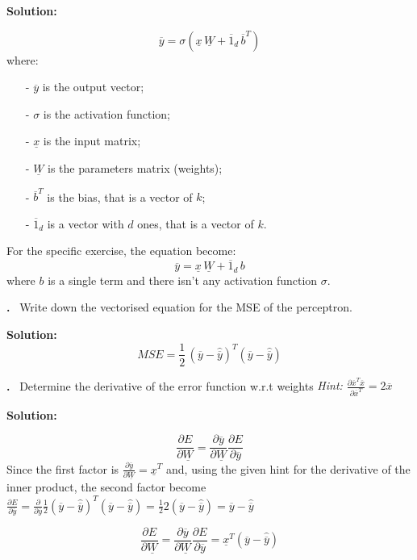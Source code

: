\documentclass[12pt]{article}
\newcounter{problem}
\newcounter{solution}
\newcommand\Problem{%
	\stepcounter{problem}%
	\textbf{\theproblem.}~%
	\setcounter{solution}{0}%
}
\newcommand\Solution{%
	\textbf{Solution:}\\%
}
\begin{document}
\Solution{
	\begin{equation}
	\overline{y}=\sigma(\underline{x} \, \underline{W}+\overline{1}_d \, \overline{b}^T)
	\end{equation}
	where:
	\begin{itemize}
		\item[-] $\overline{y}$ is the output vector; 
		\item[-] $\sigma$ is the activation function;
		\item[-] $\underline{x}$ is the input matrix;
		\item[-] $\underline{W}$ is the parameters matrix (weights);
		\item[-] $\overline{b}^T$ is the bias, that is a vector of $k$;
		\item[-] $\overline{1}_d$ is a vector  with $d$ ones, that is a vector of $k$.
	\end{itemize}
For the specific exercise, the equation become:
	\begin{equation}
	\overline{y}=\underline{x} \, \underline{W}+\overline{1}_d \, b
	\end{equation}
	where $b$ is a single term and there isn't any activation function $\sigma$.
}

\Problem{Write down the vectorised equation for the MSE of the perceptron.}

\Solution{	
	\begin{equation}
	MSE = \frac{1}{2} \, (\overline{y}-\hat{\overline{y}})^T(\overline{y}-\hat{\overline{y}})
	\end{equation}}

\Problem{Determine the derivative of the error function w.r.t weights \textit{Hint: $\frac{\partial \overline{x}^T\overline{x}}{\partial\overline{x}^T} = 2\overline{x}$}}

\Solution{	
	\begin{equation}
	 \frac{\partial E}{\partial \underline{W}}= \frac{\partial \overline{y}}{\partial \underline{W}}\frac{\partial E}{\partial \overline{y}}
	\end{equation}
	Since the first factor is $\frac{\partial \overline{y}}{\partial \underline{W}}=\underline{x}^T$ and, using the given hint for the derivative of the inner product, the second factor become $\frac{\partial E}{\partial \overline{y}} = \frac{\partial }{\partial \overline{y}} \frac{1}{2}(\overline{y}-\hat{\overline{y}})^T(\overline{y}-\hat{\overline{y}}) = \frac{1}{2}2(\overline{y}-\hat{\overline{y}})=\overline{y}-\hat{\overline{y}}$
	
	 
	\begin{equation}
		 \frac{\partial E}{\partial \underline{W}}= \frac{\partial \overline{y}}{\partial \underline{W}}\frac{\partial E}{\partial \overline{y}} = \underline{x}^T(\overline{y}-\hat{\overline{y}})
	\end{equation}
}
\end{document}

